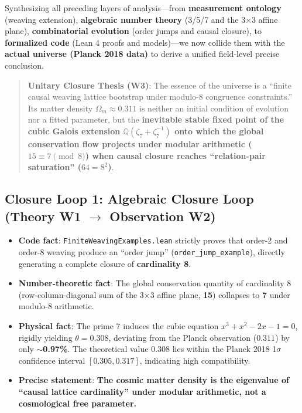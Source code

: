 \documentclass[aps,prd,twocolumn,nofootinbib,floatfix]{revtex4-2}
\begin{document}
Synthesizing all preceding layers of analysis---from \textbf{measurement ontology} (weaving extension), \textbf{algebraic number theory} (3/5/7 and the 3$\times$3 affine plane), \textbf{combinatorial evolution} (order jumps and causal closure), to \textbf{formalized code} (Lean 4 proofs and models)---we now collide them with the \textbf{actual universe (Planck 2018 data)} to derive a unified field-level precise conclusion.

\begin{quote}
\textbf{Unitary Closure Thesis (W3)}: The essence of the universe is a ``finite causal weaving lattice bootstrap under modulo-8 congruence constraints.'' Its matter density $\Omega_m \approx 0.311$ is neither an initial condition of evolution nor a fitted parameter, but the \textbf{inevitable stable fixed point of the cubic Galois extension $\mathbb{Q}(\zeta_7+\zeta_7^{-1})$ onto which the global conservation flow projects under modular arithmetic ($15 \equiv 7 \pmod 8$) when causal closure reaches ``relation-pair saturation'' ($64 = 8^2$)}.
\end{quote}

\subsection{Closure Loop 1: Algebraic Closure Loop (Theory W1 $\to$ Observation W2)}

\begin{itemize}
    \item \textbf{Code fact}: \texttt{FiniteWeavingExamples.lean} strictly proves that order-2 and order-8 weaving produce an ``order jump'' (\texttt{order\_jump\_example}), directly generating a complete closure of \textbf{cardinality 8}.
    \item \textbf{Number-theoretic fact}: The global conservation quantity of cardinality 8 (row-column-diagonal sum of the 3$\times$3 affine plane, \textbf{15}) collapses to \textbf{7} under modulo-8 arithmetic.
    \item \textbf{Physical fact}: The prime 7 induces the cubic equation $x^3 + x^2 - 2x - 1 = 0$, rigidly yielding $\theta = 0.308$, deviating from the Planck observation ($0.311$) by only \textbf{$\sim$0.97\%}. The theoretical value 0.308 lies within the Planck 2018 1$\sigma$ confidence interval $[0.305, 0.317]$, indicating high compatibility.
    \item \textbf{Precise statement}: \textbf{The cosmic matter density is the eigenvalue of ``causal lattice cardinality'' under modular arithmetic, not a cosmological free parameter.}
\end{itemize}
\end{document}
